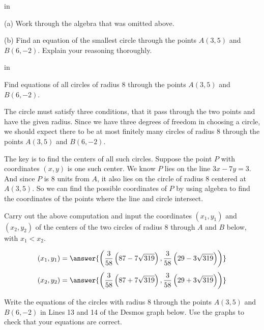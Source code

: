 \documentclass{ximera}
\newcommand{\pskip}{\vskip 0.1 in}
\begin{document}
\pskip

 (a) Work through the algebra that was omitted above.

(b) Find an equation of the smallest circle through the points $A(3,5)$ and $B(6,-2)$. Explain your reasoning thoroughly.

\pskip

\begin{example}  \label{Ex6}
Find equations of all circles of radius 8 through the points $A(3,5)$ and $B(6,-2)$.
\end{example}

\begin{explanation}
The circle must satisfy three conditions, that it pass through the two points and have the given radius. Since we have three degrees of freedom in choosing a circle, we should expect there to be at most finitely many circles of radius 8 through the points $A(3,5)$ and $B(6,-2)$.

The key is to find the centers of all such circles. Suppose the point $P$ with coordinates $(x,y)$ is one such center. We know $P$ lies on the line $3x-7y=3$. And since $P$ is 8 units from $A$, it also lies on the circle of radius $8$ centered at $A(3,5)$. So we can find the possible coordinates of $P$ by using algebra to find the coordinates of the points where the line and circle intersect.

Carry out the above computation and input the coordinates $(x_1, y_1)$ and $(x_2,y_2)$ of the centers of the two circles of radius 8 through $A$ and $B$ below, with $x_1 < x_2$. 

\begin{question} 
\[
  (x_1, y_1) = \answer{\left( \frac{3}{58}\left( 87-7\sqrt{319}\right), \frac{3}{58}\left( 29-3\sqrt{319}\right) \right)} 
\]
\[
  (x_2, y_2) = \answer{\left( \frac{3}{58}\left( 87+7\sqrt{319}\right), \frac{3}{58}\left( 29+3\sqrt{319}\right) \right)} 
\]
\end{question}



\begin{exploration}\label{exp:circle6}
Write the equations of the circles with radius 8 through the points $A(3,5)$ and $B(6,-2)$ in Lines 13 and 14 of the Desmos graph below. Use the graphs to check that your equations are correct.
 
 
\begin{onlineOnly}
    \begin{center}
\end{center}
\end{onlineOnly}
\end{exploration}

\end{explanation}
\end{document}
